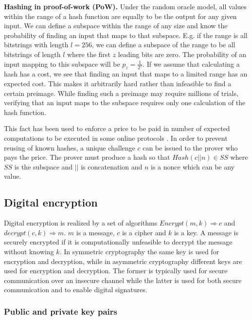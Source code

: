 {\bf Hashing in proof-of-work (PoW).}
Under the random oracle model, all values within the range of a hash function are equally to be the output for any given input. We can define a subspace within the range of any size and know the probability of finding an input that maps to that subspace. E.g. if the range is all bitstrings with length $l=256$, we can define a subspace of the range to be all bitstrings of length $l$ where the first $z$ leading bits are zero. The probability of an input mapping to this subspace will be $p_z=\frac{1}{2^z}$. If we assume that calculating a hash has a cost, we see that finding an input that maps to a limited range has an expected cost. This makes it arbitrarily hard rather than infeasible to find a certain preimage. While finding such a preimage may require millions of trials, verifying that an input maps to the subspace requires only one calculation of the hash function.  

This fact has been used to enforce a price to be paid in number of expected computations to be executed in some online protocols \cite{dwork_pricing_1993} \cite{back_hashcash-denial_2002}. In order to prevent reusing of known hashes, a unique challenge $c$ can be issued to the prover who pays the price. The prover must produce a hash so that $Hash(c || n) \in SS$ where $SS$ is the subspace and $||$ is concatenation and $n$ is a nonce which can be any value. 


\subsection{Digital encryption}

Digital encryption is realized by a set of algorithms $Encrypt(m, k) \Rightarrow c$ and $decrypt(c, k) \Rightarrow m$. $m$ is a message, $c$ is a cipher and $k$ is a key. A message is securely encrypted if it is computationally unfeasible to decrypt the message without knowing $k$. In symmetric cryptography the same key is used for encryption and decryption, while in asymmetric cryptography different keys are used for encryption and decryption. The former is typically used for secure communication over an insecure channel while the latter is used for both secure communication and to enable digital signatures.

\subsubsection{Public and private key pairs}


